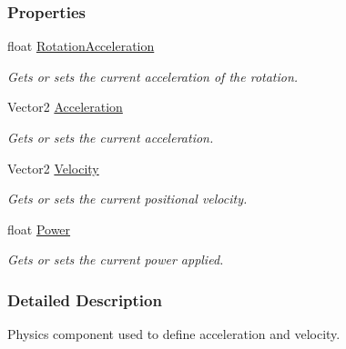 \subsubsection*{Properties}
\begin{DoxyCompactItemize}
\item 
float \hyperlink{class_m_b2_d_1_1_entity_component_1_1_physics_component_a835ff0d9866e993bfe7991bd91b2354c}{Rotation\+Acceleration}
\begin{DoxyCompactList}\small\item\em Gets or sets the current acceleration of the rotation. \end{DoxyCompactList}\item 
Vector2 \hyperlink{class_m_b2_d_1_1_entity_component_1_1_physics_component_a8a96d7392f96b702168ec3d9a348fd62}{Acceleration}
\begin{DoxyCompactList}\small\item\em Gets or sets the current acceleration. \end{DoxyCompactList}\item 
Vector2 \hyperlink{class_m_b2_d_1_1_entity_component_1_1_physics_component_a67477d82a7e9555cb9d08351c8ffe24f}{Velocity}
\begin{DoxyCompactList}\small\item\em Gets or sets the current positional velocity. \end{DoxyCompactList}\item 
float \hyperlink{class_m_b2_d_1_1_entity_component_1_1_physics_component_ac97c10e8e2bc12040b80d6d62b4c783f}{Power}
\begin{DoxyCompactList}\small\item\em Gets or sets the current power applied. \end{DoxyCompactList}\end{DoxyCompactItemize}


\subsubsection{Detailed Description}
Physics component used to define acceleration and velocity. 



